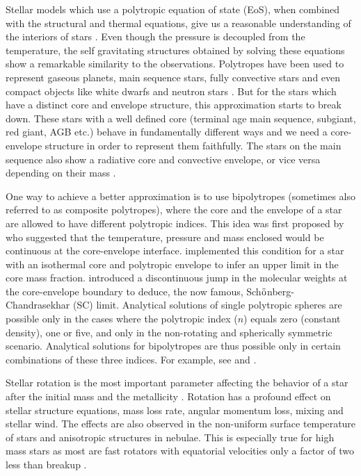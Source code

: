 \documentclass[a4paper,fleqn,usenatbib]{mnras}
\begin{document}
Stellar models which use a polytropic equation of state (EoS), when combined with the structural and thermal equations, give us a reasonable understanding of the interiors of stars \citep{Chandrasekhar1939}. Even though the pressure is decoupled from the temperature, the self gravitating structures obtained by solving these equations show a remarkable similarity to the observations. Polytropes have been used to represent gaseous planets, main sequence stars, fully convective stars and even compact objects like white dwarfs and neutron stars \citep{HKT}. But for the stars which have a distinct core and envelope structure,
this approximation starts to break down. These stars with a well defined core (terminal age main sequence, subgiant, red giant, AGB etc.) behave in fundamentally different ways and we need a core-envelope structure in order to represent them faithfully. The stars on the main sequence also show a radiative core and convective envelope, or vice versa depending on their mass \citep{PadmanabhanV2}.  

One way to achieve a better approximation is to use bipolytropes (sometimes also referred to as composite polytropes), where the core and the envelope of a star are allowed to have different polytropic indices. This idea was first proposed by \cite{Milne1930} who suggested that the temperature, pressure and mass enclosed would be continuous at the core-envelope interface. 
\cite{Henrich1941}  implemented this condition for a star with an isothermal core and polytropic envelope to infer an upper limit in the core mass fraction.
\citet{SC1942} introduced a discontinuous jump in the molecular weights at the core-envelope boundary to deduce, the now famous, Sch$\ddot{\rm{o}}$nberg-Chandrasekhar (SC) limit. 
 Analytical solutions of single polytropic spheres are possible only in the cases where the polytropic index ($n$) equals zero (constant density), one or five, and only in the non-rotating and spherically symmetric scenario. Analytical solutions for bipolytropes are thus possible only in certain combinations of these three indices. For example, see \cite{Murphy1983} and \cite{Eggleton1998}.

Stellar rotation is the most important parameter affecting the behavior of a star after the initial mass and the metallicity \citep{Meynet2002}. 
Rotation has a profound effect on stellar structure equations, mass loss rate, angular momentum loss, mixing and stellar wind. The effects are also observed in the non-uniform surface temperature of stars and anisotropic structures in nebulae.
This is especially true for high mass stars as most are fast rotators with equatorial velocities only a factor of two less than breakup \citep{Kawaler1987}. 
\end{document}
